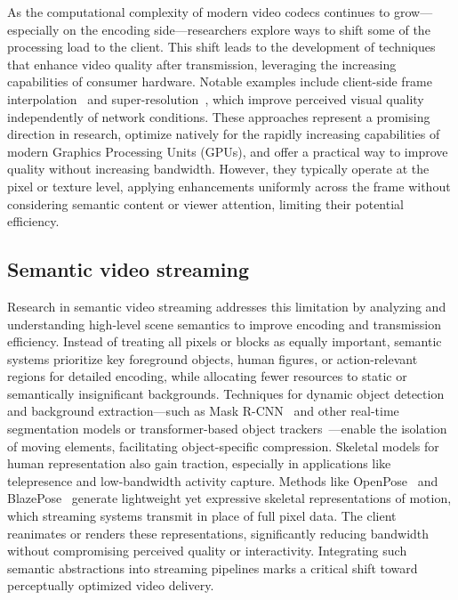 \documentclass[manuscript, screen]{acmart}
\begin{document}
As the computational complexity of modern video codecs continues to grow---especially on the encoding side---researchers explore ways to shift some of the processing load to the client. This shift leads to the development of techniques that enhance video quality after transmission, leveraging the increasing capabilities of consumer hardware. Notable examples include client-side frame interpolation~\cite{niklaus2020softmax, xu2019quadratic} and super-resolution~\cite{ledig2017photo}, which improve perceived visual quality independently of network conditions. These approaches represent a promising direction in research, optimize natively for the rapidly increasing capabilities of modern Graphics Processing Units (GPUs), and offer a practical way to improve quality without increasing bandwidth. However, they typically operate at the pixel or texture level, applying enhancements uniformly across the frame without considering semantic content or viewer attention, limiting their potential efficiency.

\subsection{Semantic video streaming}
Research in semantic video streaming addresses this limitation by analyzing and understanding high-level scene semantics to improve encoding and transmission efficiency. Instead of treating all pixels or blocks as equally important, semantic systems prioritize key foreground objects, human figures, or action-relevant regions for detailed encoding, while allocating fewer resources to static or semantically insignificant backgrounds. Techniques for dynamic object detection and background extraction---such as Mask R-CNN~\cite{he2017mask} and other real-time segmentation models or transformer-based object trackers~\cite{meinhardt2022trackformer}---enable the isolation of moving elements, facilitating object-specific compression. Skeletal models for human representation also gain traction, especially in applications like telepresence and low-bandwidth activity capture. Methods like OpenPose~\cite{cao2017realtime} and BlazePose~\cite{bazarevsky2020blazepose} generate lightweight yet expressive skeletal representations of motion, which streaming systems transmit in place of full pixel data. The client reanimates or renders these representations, significantly reducing bandwidth without compromising perceived quality or interactivity. Integrating such semantic abstractions into streaming pipelines marks a critical shift toward perceptually optimized video delivery.
\end{document}
